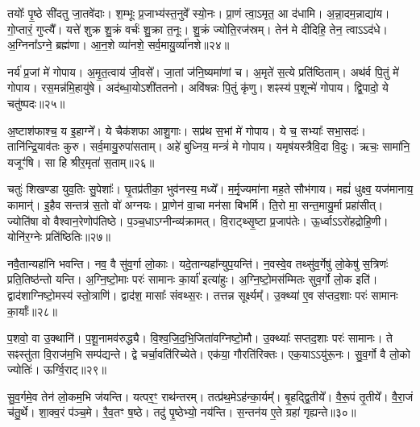 तयोः᳚ पृ॒ष्ठे सी॑दतु जा॒तवे॑दाः।
श॒म्भूः प्र॒जाभ्य॑स्त॒नुवे᳚ स्यो॒नः।
प्रा॒णं त्वा॒\-ऽमृत॒ आ द॑धामि।
अ॒न्ना॒दम॒न्नाद्या॑य।
गो॒प्तारं॒ गुप्त्यै᳚।
यत्ते॑ शुक्र शु॒क्रं वर्चः॑ शु॒क्रा त॒नूः।
शु॒क्रं ज्योति॒रज॑स्रम्।
तेन॑ मे दीदिहि॒ तेन॒ त्वाऽऽद॑धे।
अ॒ग्निना᳚\-ऽग्ने॒ ब्रह्म॑णा।
आ॒न॒शे व्या॑नशे॒ सर्व॒मायु॒र्व्या॑नशे॥२४॥\ip

नर्य॑ प्र॒जां मे॑ गोपाय।
अ॒मृ॒त॒त्वाय॑ जी॒वसे᳚।
जा॒तां ज॑नि॒ष्यमा॑णां च।
अ॒मृते॑ स॒त्ये प्रति॑\-ष्ठिताम्।
अथ॑र्व पि॒तुं मे॑ गोपाय।
रस॒मन्न॑मि॒हायु॑षे।
अद॑ब्धा॒यो\-ऽशी॑ततनो।
अवि॑षन्नः पि॒तुं कृ॑णु।
शꣴस्य॑ प॒शून्मे॑ गोपाय।
द्वि॒पादो॒ ये चतु॑ष्पदः॥२५॥\ip

अ॒ष्टाश॑फाश्च॒ य इ॒हाग्ने᳚।
ये चैक॑शफा आशु॒गाः।
सप्र॑थ स॒भां मे॑ गोपाय।
ये च॒ सभ्याः᳚ सभा॒सदः॑।
तानि॑न्द्रि॒याव॑तः कुरु।
सर्व॒मायु॒रुपा॑सताम्।
अहे॑ बुध्निय॒ मन्त्रं॑ मे गोपाय।
यमृष॑यस्त्रैवि॒दा वि॒दुः।
ऋचः॒ सामा॑नि॒ यजूꣳ॑षि।
सा हि श्रीर॒मृता॑ स॒ताम्॥२६॥\ip

चतुः॑ शिखण्डा युव॒तिः सु॒पेशाः᳚।
घृ॒तप्र॑तीका॒ भुव॑नस्य॒ मध्ये᳚।
म॒र्मृ॒ज्यमा॑ना मह॒ते सौभ॑गाय।
मह्यं॑ धुक्ष्व॒ यज॑मानाय॒ कामान्॑।
इ॒हैव सन्तत्र॑ स॒तो वो॑ अग्नयः।
प्रा॒णेन॑ वा॒चा मन॑सा बिभर्मि।
ति॒रो मा॒ सन्त॒मायु॒र्मा प्रहा॑सीत्।
ज्योति॑षा वो वैश्वान॒रेणोप॑तिष्ठे।
प॒ञ्च॒धा\-ऽग्नीन्व्य॑क्रामत्।
वि॒राट्थ्सृ॒ष्टा प्र॒जा\-प॑तेः।
ऊ॒र्ध्वा\-ऽऽरो॑हद्रोहि॒णी।
योनि॑र॒ग्नेः प्रति॑\-ष्ठितिः॥२७॥\ip\anuvakamend[वि॒श॒न्तु॒ नः॒ पु॒रू॒चीर्वि॑धेम नि॒धाय॒ यत्ते\-ऽप्र॑दाहाय बृह॒त्यो᳚ ब्रह्म॑णा दुवस्यत वि॒श्ववा॑र इ॒ममृ॑ञ्जते पुरो॒गां प्रज॑नयि॒ष्यथो॑ जनि॒ष्यते᳚\-ऽस्मै॒ मम॑ महि॒म्ना वर्च॑से॒ दध॑थ्सुव॒र्गो भा॑हि सम्बभू॒वतु॒रायु॒र्व्या॑नशे॒ चतु॑ष्पदः स॒तां प्र॒जा\-प॑ते॒र्द्वे च॑]

नवै॒तान्यहा॑नि भवन्ति।
नव॒ वै सु॑व॒र्गा लो॒काः।
यदे॒तान्यहा᳚न्युप॒यन्ति॑।
न॒वस्वे॒व तथ्सु॑व॒र्गेषु॑ लो॒केषु॑ स॒त्रिणः॑ प्रति॒तिष्ठ॑न्तो यन्ति।
अ॒ग्नि॒ष्टो॒माः परः॑ सामानः का॒र्या॑ इत्या॑हुः।
अ॒ग्नि॒ष्टो॒मस॑म्मितः सुव॒र्गो लो॒क इति॑।
द्वाद॑शाग्निष्टो॒मस्य॑ स्तो॒त्राणि॑।
द्वाद॑श॒ मासाः᳚ संवथ्स॒रः।
तत्तन्न सूर्क्ष्यम्᳚।
उ॒क्थ्या॑ ए॒व स॑प्तद॒शाः परः॑ सामानः का॒र्याः᳚॥२८॥\ip

प॒शवो॒ वा उ॒क्थानि॑।
प॒शू॒नामव॑रुद्ध्यै।
वि॒श्व॒जि॒द॒भि॒जिता॑\-वग्निष्टो॒मौ।
उ॒क्थ्याः᳚ सप्तद॒शाः परः॑ सामानः।
ते सꣴस्तु॑ता वि॒राज॑म॒भि सम्प॑द्यन्ते।
द्वे चर्चा॒वति॑रिच्येते।
एक॑या॒ गौरति॑रिक्तः।
एक॒या\-ऽऽयु॑रू॒नः।
सु॒व॒र्गो वै लो॒को ज्योतिः॑।
ऊर्ग्वि॒राट्॥२९॥\ip

सु॒व॒र्गमे॒व तेन॑ लो॒कम॒भि ज॑यन्ति।
यत्पर॒ꣳ॒ राथ॑न्तरम्।
तत्प्र॑थ॒मे\-ऽह॑न्का॒र्यम्᳚।
बृ॒हद्द्वि॒तीये᳚।
वै॒रू॒पं तृ॒तीये᳚।
वै॒रा॒जं च॑तु॒र्थे।
शा॒क्व॒रं प॑ञ्च॒मे।
रै॒व॒तꣳ ष॒ष्ठे।
तदु॑ पृ॒ष्ठेभ्यो॒ नय॑न्ति।
स॒न्तन॑य ए॒ते ग्रहा॑ गृह्यन्ते॥३०॥\ip


